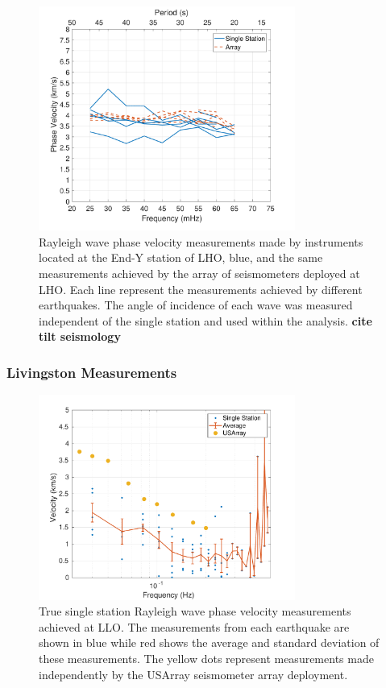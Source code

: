 \documentclass [12pt, proquest]{uwthesis}[2019]
\begin{document}
\begin{figure}%
\begin{center}
\includegraphics[width=0.75\textwidth]{Vel.pdf}
\caption{Rayleigh wave phase velocity measurements made by instruments located at the End-Y station of LHO, blue, and the same measurements achieved by the array of seismometers deployed at LHO. Each line represent the measurements achieved by different earthquakes. The angle of incidence of each wave was measured independent of the single station and used within the analysis. \textbf{cite tilt seismology}}
\label{Phase_Hanford}
\end{center}
\end{figure}

\subsubsection{Livingston Measurements}

\begin{figure}%
\begin{center}
\includegraphics[width=0.75\textwidth]{RayleighDispersion.pdf}
\caption{True single station Rayleigh wave phase velocity measurements achieved at LLO. The measurements from each earthquake are shown in blue while red shows the average and standard deviation of these measurements. The yellow dots represent measurements made independently by the USArray seismometer array deployment.}
\label{Phase_Livingston}
\end{center}
\end{figure}
\end{document}
